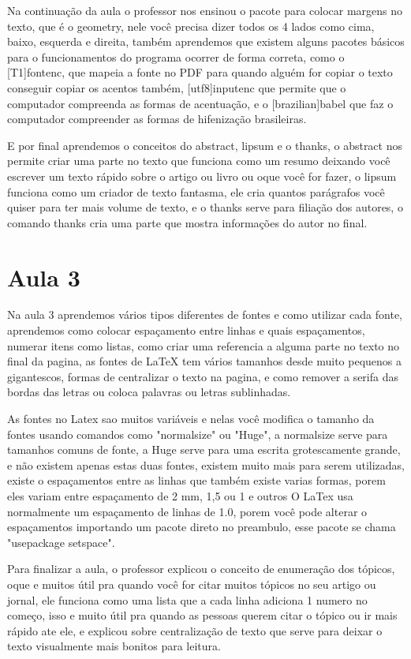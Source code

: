 Na continuação da aula o professor nos ensinou o pacote para colocar margens no texto, que é o geometry, nele você precisa dizer todos os 4 lados como cima, baixo, esquerda e direita, também aprendemos que existem alguns pacotes básicos para o funcionamentos do programa ocorrer de forma correta, como o [T1]{fontenc}, que mapeia a fonte no PDF para quando alguém for copiar o texto conseguir copiar os acentos também, [utf8]{inputenc} que permite que o computador compreenda as formas de acentuação, e o [brazilian]{babel} que faz o computador compreender as  formas de hifenização brasileiras. 


E por final aprendemos o conceitos do abstract, lipsum e o thanks, o abstract nos permite criar uma parte no texto que funciona como um resumo deixando você escrever um texto rápido sobre o artigo ou livro ou oque você for fazer, o lipsum funciona como um criador de texto fantasma, ele cria quantos parágrafos você quiser para ter mais volume de texto, e o thanks serve para filiação dos autores, o comando thanks cria uma parte que mostra informações do autor no final.

\section{Aula 3}

Na aula 3 aprendemos vários tipos diferentes de fontes e como utilizar cada fonte, aprendemos como colocar espaçamento entre linhas e quais espaçamentos, numerar itens como listas, como criar uma referencia a alguma parte no texto no final da pagina, as fontes de LaTeX tem vários tamanhos desde muito pequenos a gigantescos, formas de centralizar o texto na pagina, e como remover a  serifa das bordas das letras ou coloca palavras ou letras sublinhadas.


As fontes no Latex sao muitos variáveis e nelas você modifica o tamanho da fontes usando comandos como "normalsize" ou "Huge", a normalsize serve para tamanhos comuns de fonte, a Huge serve para uma escrita grotescamente grande, e não existem apenas estas duas fontes, existem muito mais para serem utilizadas, existe o espaçamentos entre as linhas que também existe varias formas, porem eles variam entre espaçamento de 2 mm, 1,5 ou 1 e outros O LaTex usa normalmente um espaçamento de linhas de 1.0, porem você pode alterar o espaçamentos importando um pacote direto no preambulo, esse pacote se chama "usepackage {setspace}".


Para finalizar a aula, o professor explicou o conceito de enumeração dos tópicos, oque e muitos útil pra quando você for citar muitos tópicos no seu artigo ou jornal, ele funciona como uma lista que a cada linha adiciona 1 numero no começo, isso e muito útil pra quando as pessoas querem citar o tópico ou ir mais rápido ate ele, e explicou sobre centralização de texto que serve para deixar o texto visualmente mais bonitos para leitura.

